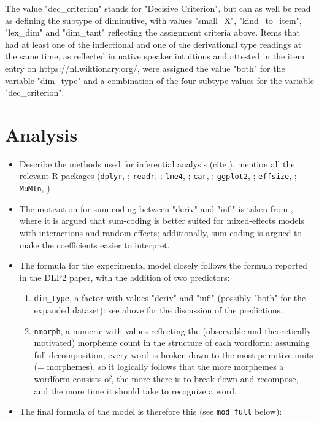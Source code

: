 The value "dec\_criterion" stands for "Decisive Criterion", but can as well be read as defining the subtype of diminutive, with values "small\_X", "kind\_to\_item", "lex\_dim" and "dim\_tant" reflecting the assignment criteria above. Items that had at least one of the inflectional and one of the derivational type readings at the same time, as reflected in native speaker intuitions and attested in the item entry on https://nl.wiktionary.org/, were assigned the value "both" for the variable "dim\_type" and a combination of the four subtype values for the variable "dec\_criterion".

\section{Analysis}
\begin{itemize}
\item Describe the methods used for inferential analysis (cite \cite{Winter+2019}), mention all the relevant R packages (\texttt{dplyr}, \cite{dplyr+2022}; \texttt{readr}, \cite{readr+2022}; \texttt{lme4}, \cite{lme4+2015}; \texttt{car}, \cite{car+2019}; \texttt{ggplot2}, \cite{ggplot2+2016}; \texttt{effsize}, \cite{effsize+2020}; \texttt{MuMIn}, \cite{MuMIn+2022})
\item The motivation for sum-coding between "deriv" and "infl" is taken from \cite{Winter+2019}, where it is argued that sum-coding is better suited for mixed-effects models with interactions and random effects; additionally, sum-coding is argued to make the coefficients easier to interpret.
\item The formula for the experimental model closely follows the formula reported in the DLP2 paper, with the addition of two predictors:
\begin{enumerate}
    \item \texttt{dim\_type}, a factor with values "deriv" and "infl" (possibly "both" for the expanded dataset): see above for the discussion of the predictions.
    \item \texttt{nmorph}, a numeric with values reflecting the (observable and theoretically motivated) morpheme count in the structure of each wordform: assuming full decomposition, every word is broken down to the most primitive units (= morphemes), so it logically follows that the more morphemes a wordform consists of, the more there is to break down and recompose, and the more time it should take to recognize a word.
\end{enumerate} 
\item The final formula of the model is therefore this (see \texttt{mod\_full} below):
\end{itemize}